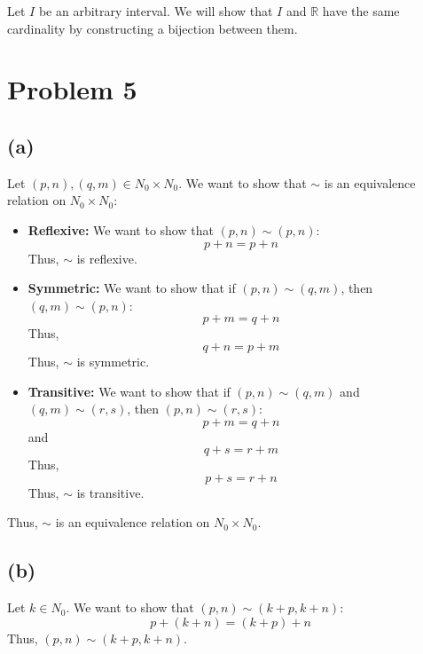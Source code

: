 \documentclass{article}
\begin{document}

Let \(I\) be an arbitrary interval. We will show that \(I\) and \(\mathbb{R}\) have the same cardinality by constructing a bijection between them.


\section*{Problem 5}


\subsection*{(a)}
Let \((p, n), (q, m) \in N_0 \times N_0\). We want to show that \(\sim\) is an equivalence relation on \(N_0 \times N_0\):
\begin{itemize}
   \item \textbf{Reflexive:} We want to show that \((p, n) \sim (p, n)\):
   \[
      p + n = p + n
   \]
   Thus, \(\sim\) is reflexive.
   \item \textbf{Symmetric:} We want to show that if \((p, n) \sim (q, m)\), then \((q, m) \sim (p, n)\):
   \[
      p + m = q + n
   \]
   Thus,
   \[
      q + n = p + m
   \]
   Thus, \(\sim\) is symmetric.
   \item \textbf{Transitive:} We want to show that if \((p, n) \sim (q, m)\) and \((q, m) \sim (r, s)\), then \((p, n) \sim (r, s)\):
   \[
      p + m = q + n
   \]
   and
   \[
      q + s = r + m
   \]
   Thus,
   \[
      p + s = r + n
   \]
   Thus, \(\sim\) is transitive.
\end{itemize}
Thus, \(\sim\) is an equivalence relation on \(N_0 \times N_0\).

\subsection*{(b)}
Let \(k \in N_0\). We want to show that \((p, n) \sim (k + p, k + n)\):
\[
   p + (k + n) = (k + p) + n
\]
Thus,
\((p, n) \sim (k + p, k + n)\).
\end{document}
